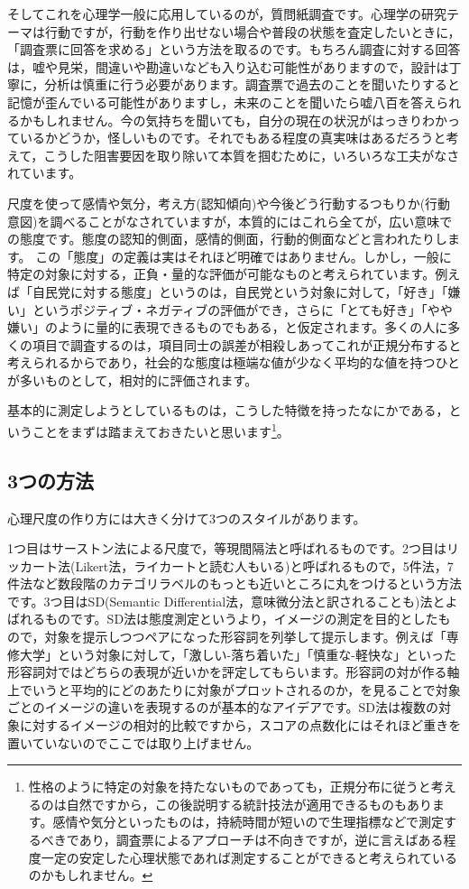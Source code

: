 \documentclass{ltjsbook}
\begin{document}
そしてこれを心理学一般に応用しているのが，質問紙調査です。心理学の研究テーマは行動ですが，行動を作り出せない場合や普段の状態を査定したいときに，「調査票に回答を求める」という方法を取るのです。もちろん調査に対する回答は，嘘や見栄，間違いや勘違いなども入り込む可能性がありますので，設計は丁寧に，分析は慎重に行う必要があります。調査票で過去のことを聞いたりすると記憶が歪んでいる可能性がありますし，未来のことを聞いたら嘘八百を答えられるかもしれません。今の気持ちを聞いても，自分の現在の状況がはっきりわかっているかどうか，怪しいものです。それでもある程度の真実味はあるだろうと考えて，こうした阻害要因を取り除いて本質を掴むために，いろいろな工夫がなされています。

尺度を使って感情や気分，考え方(認知傾向)や今後どう行動するつもりか(行動意図)を調べることがなされていますが，本質的にはこれら全てが，広い意味での態度です。態度の認知的側面，感情的側面，行動的側面などと言われたりします。
この「態度」の定義は実はそれほど明確ではありません。しかし，一般に特定の対象に対する，正負・量的な評価が可能なものと考えられています。例えば「自民党に対する態度」というのは，自民党という対象に対して，「好き」「嫌い」というポジティブ・ネガティブの評価ができ，さらに「とても好き」「やや嫌い」のように量的に表現できるものでもある，と仮定されます。多くの人に多くの項目で調査するのは，項目同士の誤差が相殺しあってこれが正規分布すると考えられるからであり，社会的な態度は極端な値が少なく平均的な値を持つひとが多いものとして，相対的に評価されます。

基本的に測定しようとしているものは，こうした特徴を持ったなにかである，ということをまずは踏まえておきたいと思います\footnote{性格のように特定の対象を持たないものであっても，正規分布に従うと考えるのは自然ですから，この後説明する統計技法が適用できるものもあります。感情や気分といったものは，持続時間が短いので生理指標などで測定するべきであり，調査票によるアプローチは不向きですが，逆に言えばある程度一定の安定した心理状態であれば測定することができると考えられているのかもしれません。}。

\subsection{3つの方法}
心理尺度の作り方には大きく分けて3つのスタイルがあります。

1つ目はサーストン法による尺度で，等現間隔法と呼ばれるものです。2つ目はリッカート法(Likert法，ライカートと読む人もいる)と呼ばれるもので，5件法，7件法など数段階のカテゴリラベルのもっとも近いところに丸をつけるという方法です。3つ目はSD(Semantic Differential法，意味微分法と訳されることも)法とよばれるものです。SD法は態度測定というより，イメージの測定を目的としたもので，対象を提示しつつペアになった形容詞を列挙して提示します。例えば「専修大学」という対象に対して，「激しい-落ち着いた」「慎重な-軽快な」といった形容詞対ではどちらの表現が近いかを評定してもらいます。形容詞の対が作る軸上でいうと平均的にどのあたりに対象がプロットされるのか，を見ることで対象ごとのイメージの違いを表現するのが基本的なアイデアです。SD法は複数の対象に対するイメージの相対的比較ですから，スコアの点数化にはそれほど重きを置いていないのでここでは取り上げません。
\end{document}
